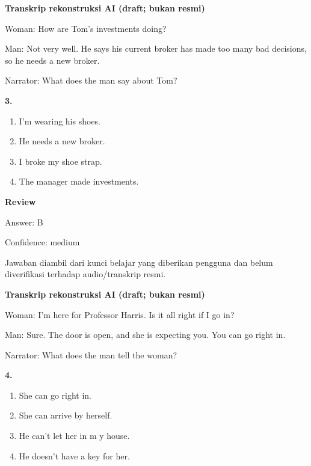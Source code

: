 \documentclass[12pt]{article}
\begin{document}
\begin{exampleblock}
\textbf{Transkrip rekonstruksi AI (draft; bukan resmi)}\par
Woman: How are Tom's investments doing?\par
Man: Not very well. He says his current broker has made too many bad decisions, so he needs a new broker.\par
Narrator: What does the man say about Tom?\par
\end{exampleblock}
\noindent\textbf{3.}
\begin{enumerate}[label=(\Alph*),leftmargin=*,itemsep=0.2em]
\item I'm wearing his shoes.
\item He needs a new broker.
\item I broke my shoe strap.
\item The manager made investments.
\end{enumerate}
\par
\begingroup
\setlength{\parskip}{0pt}
\setlength{\parindent}{0pt}
\textbf{Review}\par
Answer: B\par
Confidence: medium\par
Jawaban diambil dari kunci belajar yang diberikan pengguna dan belum diverifikasi terhadap audio/transkrip resmi.\par
\endgroup
\par
\vspace{0.25\baselineskip}
\begin{exampleblock}
\textbf{Transkrip rekonstruksi AI (draft; bukan resmi)}\par
Woman: I'm here for Professor Harris. Is it all right if I go in?\par
Man: Sure. The door is open, and she is expecting you. You can go right in.\par
Narrator: What does the man tell the woman?\par
\end{exampleblock}
\noindent\textbf{4.}
\begin{enumerate}[label=(\Alph*),leftmargin=*,itemsep=0.2em]
\item She can go right in.
\item She can arrive by herself.
\item He can't let her in m y house.
\item He doesn't have a key for her.
\end{enumerate}
\par
\end{document}
